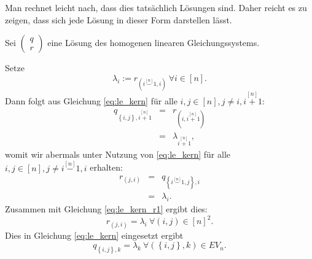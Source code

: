 \documentclass[10p,a4paper,BCOR = 12mm, DIV=15]{scrbook}
\begin{document}
\begin{bew}
Man rechnet leicht nach, dass dies tatsächlich Lösungen sind. Daher reicht es zu zeigen, dass sich jede Lösung in dieser Form darstellen lässt.

Sei $\left(\begin{array}{c}
q \\
r
\end{array}\right)$ eine Lösung des homogenen linearen Gleichungssystems.

Setze
\begin{equation}
\lambda_{i} := r_{\left(i \stackrel{[n]}{-} 1, i\right)} \ \forall i\in\left[n\right]. \label{eq:le_kern_r1}
\end{equation}
Dann folgt aus Gleichung \eqref{eq:le_kern} für alle $i, j\in\left[n\right], j\neq i, i \stackrel{[n]}{+} 1$:
\begin{eqnarray*}
q_{\left\{i, j\right\}, i \stackrel{[n]}{+} 1} & = & r_{\left(i, i \stackrel{[n]}{+} 1\right)} \\
& = & \lambda_{i \stackrel{[n]}{+} 1},
\end{eqnarray*}
womit wir abermals unter Nutzung von \eqref{eq:le_kern} für alle $i, j\in\left[n\right], j\neq i \stackrel{[n]}{-} 1, i$ erhalten:
\begin{eqnarray*}
r_{\left(j, i\right)} & = & q_{\left\{i \stackrel{[n]}{-} 1, j\right\}, i} \\
& = & \lambda_i.
\end{eqnarray*}
Zusammen mit Gleichung \eqref{eq:le_kern_r1} ergibt dies:
\begin{displaymath}
r_{\left(j, i\right)} = \lambda_i\ \forall \left(i, j\right)\in\left[n\right]^2.
\end{displaymath}
Dies in Gleichung \eqref{eq:le_kern} eingesetzt ergibt
\begin{displaymath}
q_{\left\{i, j\right\},k} = \lambda_k\ \forall \left(\left\{i, j\right\}, k\right)\in EV_n.
\end{displaymath}
\end{bew}
\end{document}
